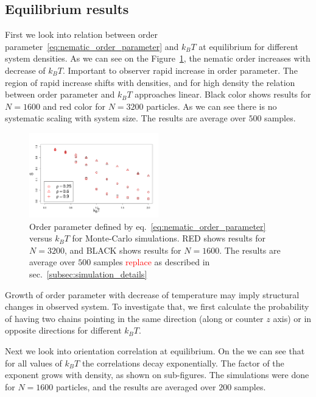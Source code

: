 \subsection{Equilibrium results}
\label{subsec:monte_carlo_results}
First we look into relation between order parameter~\eqref{eq:nematic_order_parameter} and $k_BT$ at equilibrium for different system densities. As we can see on the Figure~\ref{fig:op_kbt}, the nematic order increases with decrease of $k_BT$. Important to observer rapid increase in order parameter. The region of rapid increase shifts with densities, and for high density the relation between order parameter and $k_BT$ approaches linear. Black color shows results for $N = 1600$ and red color for $N = 3200$ particles. As we can see there is no systematic scaling with system size. The results are average over $500$ samples.

\begin{figure}[h]
	\centering
	\includegraphics[width=0.5\textwidth]{Images/op_vs_kbt_MC.png}
	\captionsetup{justification=centering, width=0.9\columnwidth}
	\caption{Order parameter defined by eq.~\eqref{eq:nematic_order_parameter} versus $k_BT$ for Monte-Carlo simulations. RED shows results for $N = 3200$, and BLACK shows results for $N = 1600$. The results are average over $500$ samples \textcolor{red}{replace} as described in sec.~\ref{subsec:simulation_details}}
	\label{fig:op_kbt}
\end{figure}

Growth of order parameter with decrease of temperature may imply structural changes in observed system. To investigate that, we first calculate the probability of having two chains pointing in the same direction (along or counter $z$ axis) or in opposite directions for different $k_BT$.

Next we look into orientation correlation at equilibrium. On the  we can see that for all values of $k_BT$ the correlations decay exponentially. The factor of the exponent grows with density, as shown on sub-figures. The simulations were done for $N = 1600$ particles, and the results are averaged over $200$ samples.

